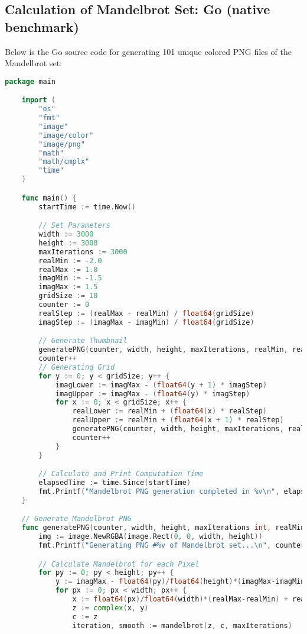 \subsection{Calculation of Mandelbrot Set: Go (native benchmark)}
\label{app:code:mandelbrot1}
Below is the Go source code for generating 101 unique colored \ac{PNG} files of the Mandelbrot set:

\begin{lstlisting}[language=go, frame=tb, caption={Mandelbrot Set Calculation}]
    package main

    import (
        "os"
        "fmt"
        "image"
        "image/color"
        "image/png"
        "math"
        "math/cmplx"
        "time"
    )

    func main() {
        startTime := time.Now()

        // Set Parameters
        width := 3000
        height := 3000
        maxIterations := 3000
        realMin := -2.0
        realMax := 1.0
        imagMin := -1.5
        imagMax := 1.5
        gridSize := 10
        counter := 0
        realStep := (realMax - realMin) / float64(gridSize)
        imagStep := (imagMax - imagMin) / float64(gridSize) 

        // Generate Thumbnail
        generatePNG(counter, width, height, maxIterations, realMin, realMax, imagMin, imagMax)
        counter++
        // Generating Grid
        for y := 0; y < gridSize; y++ {
            imagLower := imagMax - (float64(y + 1) * imagStep)
            imagUpper := imagMax - (float64(y) * imagStep)
            for x := 0; x < gridSize; x++ {
                realLower := realMin + (float64(x) * realStep)
                realUpper := realMin + (float64(x + 1) * realStep)
                generatePNG(counter, width, height, maxIterations, realLower, realUpper, imagLower, imagUpper)
                counter++
            }   
        }

        // Calculate and Print Computation Time
        elapsedTime := time.Since(startTime)
        fmt.Printf("Mandelbrot PNG generation completed in %v\n", elapsedTime)
    }

    // Generate Mandelbrot PNG
    func generatePNG(counter, width, height, maxIterations int, realMin, realMax, imagMin, imagMax float64) {
        img := image.NewRGBA(image.Rect(0, 0, width, height))
        fmt.Printf("Generating PNG #%v of Mandelbrot set...\n", counter)

        // Calculate Mandelbrot for each Pixel
        for py := 0; py < height; py++ {
            y := imagMax - float64(py)/float64(height)*(imagMax-imagMin)
            for px := 0; px < width; px++ {
                x := float64(px)/float64(width)*(realMax-realMin) + realMin
                z := complex(x, y)
                c := z
                iteration, smooth := mandelbrot(z, c, maxIterations)


\end{lstlisting}
